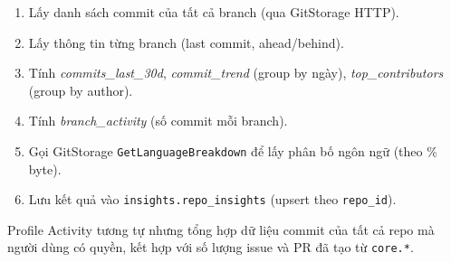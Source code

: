 \begin{enumerate}
\item Lấy danh sách commit của tất cả branch (qua GitStorage HTTP).
\item Lấy thông tin từng branch (last commit, ahead/behind).
\item Tính \textit{commits\_last\_30d}, \textit{commit\_trend} (group by ngày), \textit{top\_contributors} (group by author).
\item Tính \textit{branch\_activity} (số commit mỗi branch).
\item Gọi GitStorage \texttt{GetLanguageBreakdown} để lấy phân bố ngôn ngữ (theo \% byte).
\item Lưu kết quả vào \texttt{insights.repo\_insights} (upsert theo \texttt{repo\_id}).
\end{enumerate}

Profile Activity tương tự nhưng tổng hợp dữ liệu commit của tất cả repo mà người dùng có quyền, kết hợp với số lượng issue và PR đã tạo từ \texttt{core.*}.
